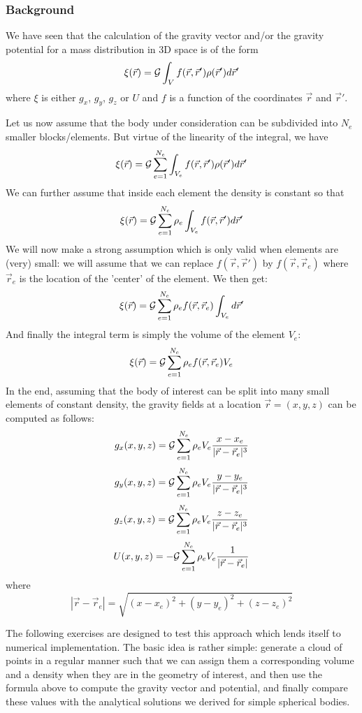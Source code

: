 
\subsubsection{Background}

We have seen that the calculation of the gravity vector and/or the gravity potential 
for a mass distribution in 3D space is of the form 
\[
\xi(\vec{r})= {\cal G}  \int_V f(\vec{r},\vec{r}') \rho(\vec{r}') d\vec{r}'
\]
where $\xi$ is either $g_x$, $g_y$, $g_z$ or $U$ and $f$ is a function of the coordinates $\vec{r}$
and $\vec{r}'$.

Let us now assume that the body under consideration can be subdivided into $N_e$ smaller blocks/elements.
But virtue of the linearity of the integral, we have
\[
\xi(\vec{r})={\cal G} \sum_{e=1}^{N_e} \int_{V_e} f(\vec{r},\vec{r}') \rho(\vec{r}') d\vec{r}'
\]
We can further assume that inside each element the density is constant so that 
\[
\xi(\vec{r})={\cal G} \sum_{e=1}^{N_e} \rho_e \int_{V_e} f(\vec{r},\vec{r}') d\vec{r}'
\]
We will now make a strong assumption which is only valid when elements are (very) small:
we will assume that we can replace $f(\vec{r},\vec{r}')$ by $f(\vec{r},\vec{r}_e)$
where $\vec{r}_e$ is the location of the 'center' of the element. We then get:
\[
\xi(\vec{r})= {\cal G}\sum_{e=1}^{N_e} \rho_e  f(\vec{r},\vec{r}_e) \int_{V_e}d\vec{r}'
\]
And finally the integral term is simply the volume of the element $V_e$:
\[
\xi(\vec{r})= {\cal G} \sum_{e=1}^{N_e} \rho_e  f(\vec{r},\vec{r}_e) V_e
\]
In the end, assuming that the body of interest can be split into many small 
elements of constant density, the gravity fields at a location $\vec{r}=(x,y,z)$
can be computed as follows:
\[
g_x(x,y,z) = {\cal G} \sum_{e=1}^{N_e} \rho_e V_e  \frac{x-x_e}{|\vec{r}-\vec{r}_e|^3}
\]
\[
g_y(x,y,z) = {\cal G} \sum_{e=1}^{N_e} \rho_e V_e  \frac{y-y_e}{|\vec{r}-\vec{r}_e|^3}
\]
\[
g_z(x,y,z) = {\cal G} \sum_{e=1}^{N_e} \rho_e V_e  \frac{z-z_e}{|\vec{r}-\vec{r}_e|^3}
\]
\[
U(x,y,z) = -{\cal G} \sum_{e=1}^{N_e} \rho_e V_e  \frac{1}{|\vec{r}-\vec{r}_e|}
\]
where 
\[
|\vec{r}-\vec{r}_e|=\sqrt{ (x-x_e)^2+(y-y_e)^2+(z-z_e)^2   }
\]

The following exercises are designed to test this approach which lends itself to 
numerical implementation. 
The basic idea is rather simple: generate a cloud of points in a regular manner such that 
we can assign them a corresponding volume and a density when they are in the geometry of interest, 
and then use the formula above to compute the gravity vector and potential, and finally 
compare these values with the analytical solutions we derived for simple spherical bodies. 

